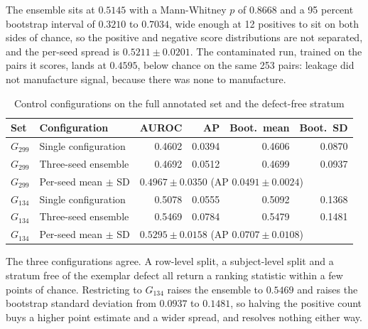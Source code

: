 The ensemble sits at $0.5145$ with a Mann-Whitney $p$ of $0.8668$ and a 95 percent bootstrap
interval of $0.3210$ to $0.7034$, wide enough at 12 positives to sit on both sides of chance, so the
positive and negative score distributions are not separated, and the per-seed
spread is $0.5211 \pm 0.0201$. The contaminated run, trained on the pairs it
scores, lands at $0.4595$, below chance on the same 253 pairs: leakage did not
manufacture signal, because there was none to manufacture.

\begin{table}[H]
\caption{Control configurations on the full annotated set and the defect-free
stratum}
\centering
\small
\begin{tabular}{llrrrr}
\toprule
\textbf{Set} & \textbf{Configuration} & \textbf{AUROC} & \textbf{AP} &
\textbf{Boot.\ mean} & \textbf{Boot.\ SD} \\
\midrule
$G_{299}$ & Single configuration   & 0.4602 & 0.0394 & 0.4606 & 0.0870 \\
$G_{299}$ & Three-seed ensemble    & 0.4692 & 0.0512 & 0.4699 & 0.0937 \\
$G_{299}$ & Per-seed mean $\pm$ SD & \multicolumn{4}{l}{$0.4967 \pm 0.0350$ (AP $0.0491 \pm 0.0024$)} \\
$G_{134}$ & Single configuration   & 0.5078 & 0.0555 & 0.5092 & 0.1368 \\
$G_{134}$ & Three-seed ensemble    & 0.5469 & 0.0784 & 0.5479 & 0.1481 \\
$G_{134}$ & Per-seed mean $\pm$ SD & \multicolumn{4}{l}{$0.5295 \pm 0.0158$ (AP $0.0707 \pm 0.0108$)} \\
\bottomrule
\end{tabular}
\label{tab:control299}
\end{table}

The three configurations agree. A row-level split, a subject-level split and a
stratum free of the exemplar defect all return a ranking statistic within a few
points of chance. Restricting to $G_{134}$ raises the ensemble to $0.5469$ and
raises the bootstrap standard deviation from $0.0937$ to $0.1481$, so halving the
positive count buys a higher point estimate and a wider spread, and resolves
nothing either way.

